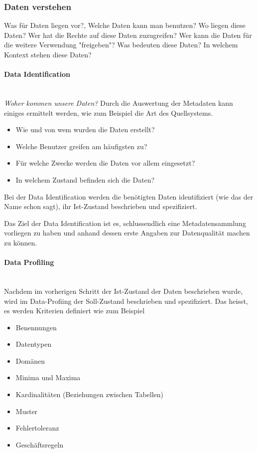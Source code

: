 \documentclass[a4paper, 11pt, nofootinbib]{article}
\begin{document}
\subsubsection{Daten verstehen}
Was für Daten liegen vor?, Welche Daten kann man benutzen? Wo liegen diese Daten? Wer hat die Rechte auf diese Daten zuzugreifen? Wer kann die Daten für die weitere Verwendung "freigeben"? Was bedeuten diese Daten? In welchem Kontext stehen diese Daten?

\paragraph{Data Identification}\mbox{}\\
\textit{Woher kommen unsere Daten?} Durch die Auswertung der Metadaten kann einiges ermittelt werden, wie zum Beispiel die Art des Quellsystems.

\begin{itemize}
	\item Wie und von wem wurden die Daten erstellt?
	\item Welche Benutzer greifen am häufigsten zu?
	\item Für welche Zwecke werden die Daten vor allem eingesetzt?
	\item In welchem Zustand befinden sich die Daten?	
\end{itemize}

Bei der Data Identification werden die benötigten Daten identifiziert (wie das der Name schon sagt), ihr Ist-Zustand beschrieben und spezifiziert. 

Das Ziel der Data Identification ist es, schlussendlich eine Metadatensammlung vorliegen zu haben und anhand dessen erste Angaben zur Datenqualität machen zu können.

\newpage

\paragraph{Data Profiling} \mbox{}\\
Nachdem im vorherigen Schritt der Ist-Zustand der Daten beschrieben wurde, wird im Data-Profiing der Soll-Zustand beschrieben und spezifiziert. Das heisst, es werden Kriterien definiert wie zum Beispiel

\begin{itemize}
	\item Benennungen
	\item Datentypen
	\item Domänen
	\item Minima und Maxima
	\item Kardinalitäten (Beziehungen zwischen Tabellen)
	\item Muster
	\item Fehlertoleranz
	\item Geschäftsregeln
\end{itemize}
\end{document}
